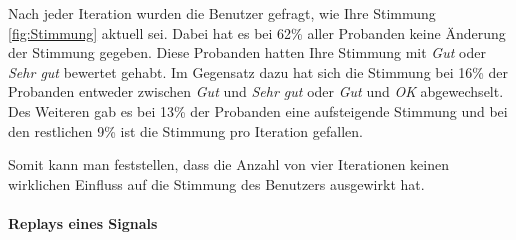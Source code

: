 Nach jeder Iteration wurden die Benutzer gefragt, wie Ihre Stimmung \autoref{fig:Stimmung} aktuell sei. 
Dabei hat es bei 62\% aller Probanden keine {\"A}nderung der Stimmung gegeben. 
Diese Probanden hatten Ihre Stimmung mit \textit{Gut} oder \textit{Sehr gut} bewertet gehabt. 
Im Gegensatz dazu hat sich die Stimmung bei 16\% der Probanden entweder zwischen \textit{Gut} und \textit{Sehr gut} oder \textit{Gut} und \textit{OK} abgewechselt. 
Des Weiteren gab es bei 13\% der Probanden eine aufsteigende Stimmung und bei den restlichen 9\% ist die Stimmung pro Iteration gefallen.

Somit kann man feststellen, dass die Anzahl von vier Iterationen keinen wirklichen Einfluss auf die Stimmung des Benutzers ausgewirkt hat.


\paragraph{Replays eines Signals}

